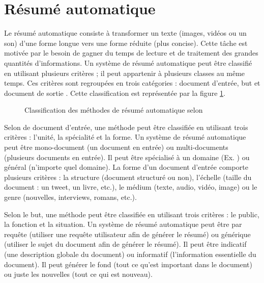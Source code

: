 \documentclass{KodeBook}
\begin{document}
\section{Résumé automatique}

Le résumé automatique consiste à transformer un texte (images, vidéos ou un son) d'une forme longue vers une forme réduite (plus concise).
Cette tâche est motivée par le besoin de gagner du temps de lecture et de traitement des grandes quantités d'informations.
Un système de résumé automatique peut être classifié en utilisant plusieurs critères ; il peut appartenir à plusieurs classes au même temps.
Ces critères sont regroupées en trois catégories : document d'entrée, but et document de sortie \cite{98-hovy-lin,99-sparckjones}.
Cette classification est représentée par la figure \ref{fig:ats-class}.

\begin{figure}[!ht]
	\centering
	\caption[Classification des méthodes de résumé automatique]{Classification des méthodes de résumé automatique selon \citet{98-hovy-lin,99-sparckjones}}
	\label{fig:ats-class}
\end{figure}

Selon de document d'entrée, une méthode peut être classifiée en utilisant trois critères : l'unité, la spécialité et la forme. 
Un système de résumé automatique peut être mono-document (un document en entrée) ou multi-documents (plusieurs documents en entrée). 
Il peut être spécialisé à un domaine (Ex. ) ou général (n'importe quel domaine).
La forme d'un document d'entrée comporte plusieurs critères : la structure (document structuré ou non), l'échelle (taille du document : un tweet, un livre, etc.), le médium (texte, audio, vidéo, image) ou le genre (nouvelles, interviews, romans, etc.).

Selon le but, une méthode peut être classifiée en utilisant trois critères : le public, la fonction et la situation. 
Un système de résumé automatique peut être par requête (utiliser une requête utilisateur afin de générer le résumé) ou générique (utiliser le sujet du document afin de générer le résumé).
Il peut être indicatif (une description globale du document) ou informatif (l'information essentielle du document). 
Il peut générer le fond (tout ce qu'est important dans le document) ou juste les nouvelles (tout ce qui est nouveau).
\end{document}
